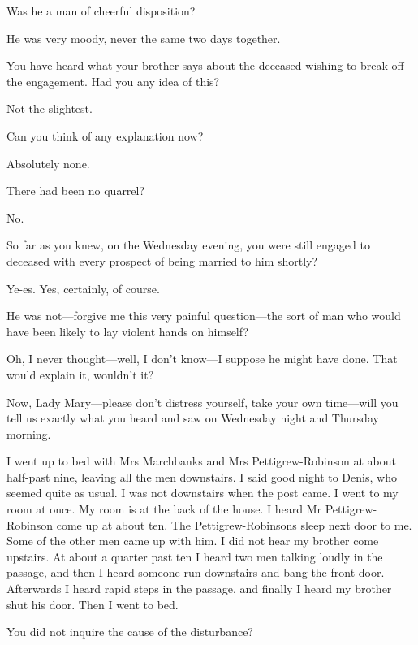 \begin{dialogue}
 Was he a man of cheerful disposition?

 He was very moody, never the same two days together.

 You have heard what your brother says about the deceased wishing to break off the engagement. Had you any idea of this?

 Not the slightest.

 Can you think of any explanation now?

 Absolutely none.

 There had been no quarrel?

 No.

 So far as you knew, on the Wednesday evening, you were still engaged to deceased with every prospect of being married to him shortly?

 Ye-es. Yes, certainly, of course.

 He was not\allowbreak---\allowbreak forgive me this very painful question\allowbreak---\allowbreak the sort of man who would have been likely to lay violent hands on himself?

 Oh, I never thought\allowbreak---\allowbreak well, I don't know\allowbreak---\allowbreak I suppose he might have done. That would explain it, wouldn't it?

 Now, Lady Mary\allowbreak---\allowbreak please don't distress yourself, take your own time\allowbreak---\allowbreak will you tell us exactly what you heard and saw on Wednesday night and Thursday morning.

 I went up to bed with Mrs Marchbanks and Mrs  Pettigrew-Robinson at about half-past nine, leaving all the men downstairs. I said good night to Denis, who seemed quite as usual. I was not downstairs when the post came. I went to my room at once. My room is at the back of the house. I heard Mr Pettigrew-Robinson come up at about ten. The Pettigrew-Robinsons sleep next door to me. Some of the other men came up with him. I did not hear my brother come upstairs. At about a quarter past ten I heard two men talking loudly in the passage, and then I heard someone run downstairs and bang the front door. Afterwards I heard rapid steps in the passage, and finally I heard my brother shut his door. Then I went to bed.

 You did not inquire the cause of the disturbance?


\end{dialogue}
